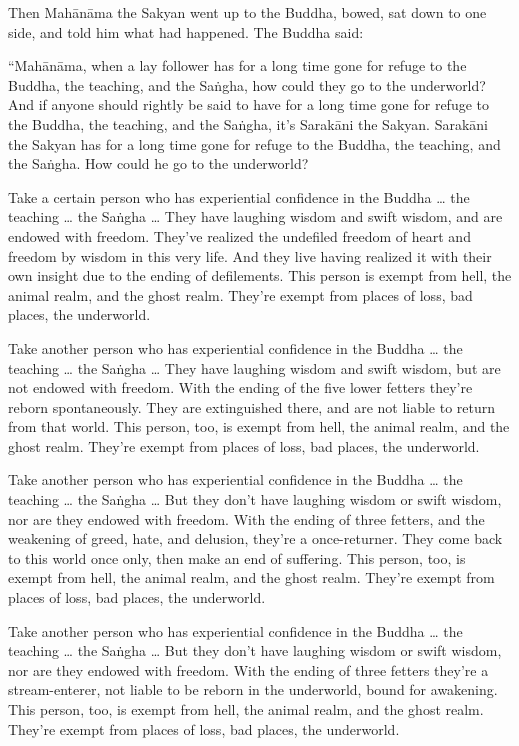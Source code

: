 \documentclass[12pt,openany]{book}%
\begin{document}
Then \textsanskrit{Mahānāma} the Sakyan went up to the Buddha, bowed, sat down to one side, and told him what had happened. The Buddha said: 

“\textsanskrit{Mahānāma}, when a lay follower has for a long time gone for refuge to the Buddha, the teaching, and the \textsanskrit{Saṅgha}, how could they go to the underworld? And if anyone should rightly be said to have for a long time gone for refuge to the Buddha, the teaching, and the \textsanskrit{Saṅgha}, it’s \textsanskrit{Sarakāni} the Sakyan. \textsanskrit{Sarakāni} the Sakyan has for a long time gone for refuge to the Buddha, the teaching, and the \textsanskrit{Saṅgha}. How could he go to the underworld? 

Take a certain person who has experiential confidence in the Buddha … the teaching … the \textsanskrit{Saṅgha} … They have laughing wisdom and swift wisdom, and are endowed with freedom. They’ve realized the undefiled freedom of heart and freedom by wisdom in this very life. And they live having realized it with their own insight due to the ending of defilements. This person is exempt from hell, the animal realm, and the ghost realm. They’re exempt from places of loss, bad places, the underworld. 

Take another person who has experiential confidence in the Buddha … the teaching … the \textsanskrit{Saṅgha} … They have laughing wisdom and swift wisdom, but are not endowed with freedom. With the ending of the five lower fetters they’re reborn spontaneously. They are extinguished there, and are not liable to return from that world. This person, too, is exempt from hell, the animal realm, and the ghost realm. They’re exempt from places of loss, bad places, the underworld. 

Take another person who has experiential confidence in the Buddha … the teaching … the \textsanskrit{Saṅgha} … But they don’t have laughing wisdom or swift wisdom, nor are they endowed with freedom. With the ending of three fetters, and the weakening of greed, hate, and delusion, they’re a once-returner. They come back to this world once only, then make an end of suffering. This person, too, is exempt from hell, the animal realm, and the ghost realm. They’re exempt from places of loss, bad places, the underworld. 

Take another person who has experiential confidence in the Buddha … the teaching … the \textsanskrit{Saṅgha} … But they don’t have laughing wisdom or swift wisdom, nor are they endowed with freedom. With the ending of three fetters they’re a stream-enterer, not liable to be reborn in the underworld, bound for awakening. This person, too, is exempt from hell, the animal realm, and the ghost realm. They’re exempt from places of loss, bad places, the underworld. 
\end{document}
